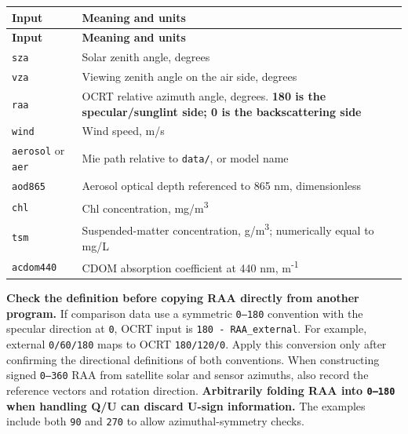 {\TableFont
\begin{longtable}{@{}>{\raggedright\arraybackslash}p{}>{\raggedright\arraybackslash}p{}@{}}
\toprule
\textbf{Input} & \textbf{Meaning and units} \\
\midrule
\endfirsthead
\toprule
\textbf{Input} & \textbf{Meaning and units} \\
\midrule
\endhead
\bottomrule
\endfoot
\texttt{sza} & Solar zenith angle, degrees \\
\texttt{vza} & Viewing zenith angle on the air side, degrees \\
\texttt{raa} & OCRT relative azimuth angle, degrees. \textbf{180\textdegree{} is the specular/sunglint side; 0\textdegree{} is the backscattering side} \\
\texttt{wind} & Wind speed, m/s \\
\texttt{aerosol} or \texttt{aer} & Mie path relative to \texttt{data/\allowbreak{}}, or model name \\
\texttt{aod865} & Aerosol optical depth referenced to 865 nm, dimensionless \\
\texttt{chl} & Chl concentration, mg/m\textsuperscript{3} \\
\texttt{tsm} & Suspended-matter concentration, g/m\textsuperscript{3}; numerically equal to mg/L \\
\texttt{acdom440} & CDOM absorption coefficient at 440 nm, m\textsuperscript{-}\textsuperscript{1} \\
\end{longtable}
}

\textbf{Check the definition before copying RAA directly from another program.} If comparison data use a symmetric \texttt{0--180\textdegree{}} convention with the specular direction at \texttt{0\textdegree{}}, OCRT input is \texttt{180\textdegree{} - RAA\_\allowbreak{}external}. For example, external \texttt{0/\allowbreak{}60/\allowbreak{}180\textdegree{}} maps to OCRT \texttt{180/\allowbreak{}120/\allowbreak{}0\textdegree{}}. Apply this conversion only after confirming the directional definitions of both conventions. When constructing signed \texttt{0--360\textdegree{}} RAA from satellite solar and sensor azimuths, also record the reference vectors and rotation direction. \textbf{Arbitrarily folding RAA into \texttt{0--180\textdegree{}} when handling Q/U can discard U-sign information.} The examples include both \texttt{90\textdegree{}} and \texttt{270\textdegree{}} to allow azimuthal-symmetry checks.

